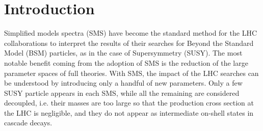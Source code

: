 \documentclass[epj,nopacs,fleqn]{svjour}
\begin{document}
\newcommand{\ONE}{\onecolumn}

\newcommand{\TWO}{\twocolumn}

%
\section{Introduction}
Simplified models spectra (SMS) have become the standard method for the LHC collaborations to interpret the results of their searches for Beyond the Standard Model (BSM) particles, as in the case of Supersymmetry (SUSY). The most notable benefit coming from the adoption of SMS is the  reduction of the large parameter spaces of full theories. With SMS, the impact of the LHC searches can be understood by introducing only a handful of new parameters. Only a few SUSY particle appears in each SMS, while all the remaining are considered decoupled, i.e. their masses are too large so that the production cross section at the LHC is negligible, and they do not appear as intermediate on-shell states in cascade decays. 
\\
\end{document}

